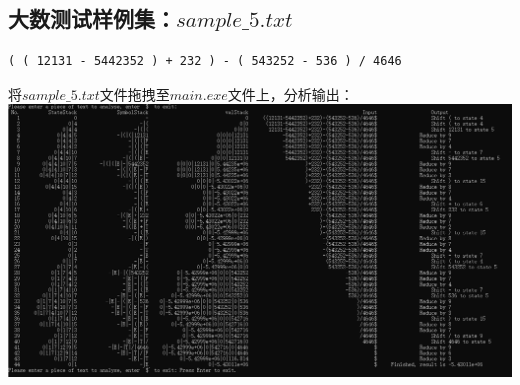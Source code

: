 \documentclass[UTF8]{ctexart}
\begin{document}
\subsection{大数测试样例集：$sample\_5.txt$}
\begin{lstlisting}
( ( 12131 - 5442352 ) + 232 ) - ( 543252 - 536 ) / 4646

    \end{lstlisting}
将$sample\_5.txt$文件拖拽至$main.exe$文件上，分析输出： \\
\includegraphics[width=\textwidth]{sample_5}
\end{document}
